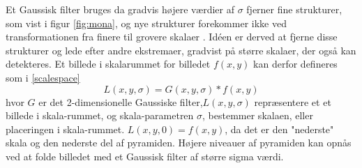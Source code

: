        \vspace{-2.5em}
\noindent
Et Gaussisk filter bruges da gradvis højere værdier af $\sigma$ fjerner fine strukturer, som vist i figur \ref{fig:mona}, og nye strukturer forekommer ikke ved transformationen fra finere til grovere skalaer \cite{lindenscale}. Idéen er derved at fjerne disse strukturer og lede efter  andre ekstremaer, gradvist på større skalaer, der også kan detekteres.
Et billede i skalarummet for billedet $f(x,y)$ kan derfor defineres som i \eqref{scalespace}
\begin{equation}
L(x,y,\sigma) = G(x,y,\sigma)\ast f(x,y)
\label{scalespace}
\end{equation}
hvor $G$ er det 2-dimensionelle Gaussiske filter,$L(x,y,\sigma)$ repræsentere et et billede i skala-rummet, og skala-parametren $\sigma$, bestemmer skalaen, eller placeringen i skala-rummet. $L(x,y,0) = f(x,y)$, da det er den "nederste" skala og den nederste del af pyramiden. Højere niveauer af pyramiden kan opnås ved at folde billedet med et Gaussisk filter af større sigma værdi.